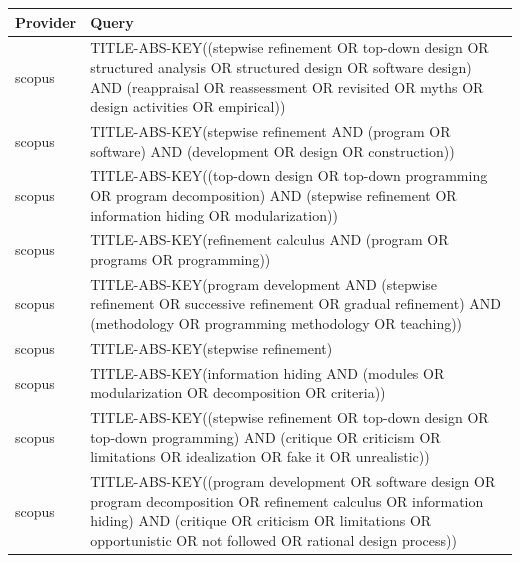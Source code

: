 \documentclass{article}
\begin{document}
\begin{longtable}{lp{10cm}}
\toprule
Provider & Query \\
\midrule
scopus & TITLE-ABS-KEY((\textquotedbl{}stepwise refinement\textquotedbl{} OR \textquotedbl{}top-down design\textquotedbl{} OR \textquotedbl{}structured analysis\textquotedbl{} OR \textquotedbl{}structured design\textquotedbl{} OR \textquotedbl{}software design\textquotedbl{}) AND (reappraisal OR reassessment OR revisited OR myths OR \textquotedbl{}design activities\textquotedbl{} OR empirical)) \\
scopus & TITLE-ABS-KEY(\textquotedbl{}stepwise refinement\textquotedbl{} AND (program OR software) AND (development OR design OR construction)) \\
scopus & TITLE-ABS-KEY((\textquotedbl{}top-down design\textquotedbl{} OR \textquotedbl{}top-down programming\textquotedbl{} OR \textquotedbl{}program decomposition\textquotedbl{}) AND (\textquotedbl{}stepwise refinement\textquotedbl{} OR \textquotedbl{}information hiding\textquotedbl{} OR modularization)) \\
scopus & TITLE-ABS-KEY(\textquotedbl{}refinement calculus\textquotedbl{} AND (program OR programs OR programming)) \\
scopus & TITLE-ABS-KEY(\textquotedbl{}program development\textquotedbl{} AND (\textquotedbl{}stepwise refinement\textquotedbl{} OR \textquotedbl{}successive refinement\textquotedbl{} OR \textquotedbl{}gradual refinement\textquotedbl{}) AND (methodology OR \textquotedbl{}programming methodology\textquotedbl{} OR teaching)) \\
scopus & TITLE-ABS-KEY(\textquotedbl{}stepwise refinement\textquotedbl{}) \\
scopus & TITLE-ABS-KEY(\textquotedbl{}information hiding\textquotedbl{} AND (modules OR modularization OR decomposition OR criteria)) \\
scopus & TITLE-ABS-KEY((\textquotedbl{}stepwise refinement\textquotedbl{} OR \textquotedbl{}top-down design\textquotedbl{} OR \textquotedbl{}top-down programming\textquotedbl{}) AND (critique OR criticism OR limitations OR idealization OR \textquotedbl{}fake it\textquotedbl{} OR unrealistic)) \\
scopus & TITLE-ABS-KEY((\textquotedbl{}program development\textquotedbl{} OR \textquotedbl{}software design\textquotedbl{} OR \textquotedbl{}program decomposition\textquotedbl{} OR \textquotedbl{}refinement calculus\textquotedbl{} OR \textquotedbl{}information hiding\textquotedbl{}) AND (critique OR criticism OR limitations OR opportunistic OR \textquotedbl{}not followed\textquotedbl{} OR \textquotedbl{}rational design process\textquotedbl{})) \\

\end{longtable}
\end{document}
